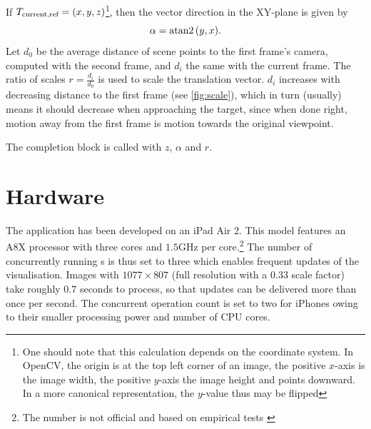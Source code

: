 If $T_{\text{current,ref}} = (x,y,z)$\footnote{One should note that this
   calculation depends on the coordinate system. In OpenCV, the origin is at the
   top left corner of an image, the positive $x$-axis is the image width, the
   positive $y$-axis the image height and points downward. In a more canonical
representation, the $y$-value thus may be flipped}, then the vector direction
in the XY-plane is given by 
\begin{equation*}
   \alpha = \atan2{(y,x)}.
\end{equation*}
Let $d_0$ be the average distance of scene points to the first frame's camera,
computed with the second frame, and $d_i$ the same with the current frame. The
ratio of scales $r=\frac{d_i}{d_0}$ is used to scale the translation vector. $d_i$
increases with decreasing distance to the first frame (see \autoref{fig:scale}),
which in turn (usually) means it should decrease when approaching the target,
since when done right, motion away from the first frame is motion towards the
original viewpoint.

The completion block is called with $z$, $\alpha$ and $r$.


\section{Hardware}

The application has been developed on an iPad Air 2. This model features an
A8X processor with three cores and $1.5$GHz per core.\footnote{The number is not
official and based on empirical tests \citep{a8x}} The number of concurrently
running s is thus set to three which
enables frequent updates of the visualisation. Images with $1077\times 807$
(full resolution with a $0.33$ scale factor) take roughly $0.7$ seconds to
process, so that updates can be delivered more than once per second. The
concurrent operation count is set to two for iPhones owing to their smaller
processing power and number of CPU cores.
